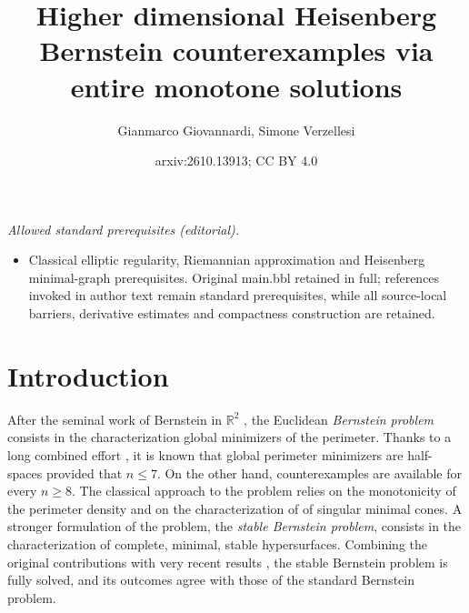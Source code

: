 \documentclass[11pt]{amsart}
\title{Higher dimensional Heisenberg Bernstein counterexamples via entire monotone solutions}
\author{Gianmarco Giovannardi, Simone Verzellesi}
\date{arxiv:2610.13913; CC BY 4.0}
\renewcommand{\leq}{\leqslant}
\renewcommand{\geq}{\geqslant}
\newcommand{\rr}{{\mathbb{R}}}
\theoremstyle{definition}
\theoremstyle{remark}
\numberwithin{equation}{section}
\begin{document}
\maketitle
\noindent\textit{Allowed standard prerequisites (editorial).}\begin{itemize}
\item Classical elliptic regularity, Riemannian approximation and Heisenberg minimal-graph prerequisites. Original main.bbl retained in full; references invoked in author text remain standard prerequisites, while all source-local barriers, derivative estimates and compactness construction are retained.
\end{itemize}\medskip
\section{Introduction}
After the seminal work of Bernstein in $\rr^2$ \cite{MR1544873}, the Euclidean \emph{Bernstein problem} consists in the characterization global minimizers of the perimeter. 
Thanks to a long combined effort \cite{MR200816,MR250205,MR178385,MR157263,MR233295}, it is known that global perimeter minimizers are half-spaces provided that $n\leq 7$. On the other hand, counterexamples are available for every $n\geq8$. 
The classical approach to the problem relies on the monotonicity of the perimeter density and on the characterization of of singular minimal cones. A stronger formulation of the problem, the \emph{stable Bernstein problem}, consists in the characterization of complete, minimal, stable hypersurfaces. Combining the original contributions \cite{MR546314,MR562550,MR630142,MR0423263} with very recent results \cite{MR4871955,MR4706440,MR4546104,MR4816633,MR5094441,hong2026stablebernsteintheoremmathbbr7,mazet2024stableminimalhypersurfacesmathbb}, the stable Bernstein problem is fully solved, and its outcomes agree with those of the standard Bernstein problem. 
\end{document}
